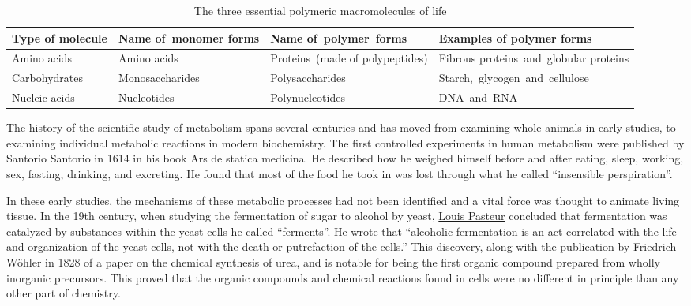 \begin{table}

\caption{\label{tab:macromol}The three essential polymeric macromolecules of life}
\centering
\begin{tabular}[t]{>{\raggedright\arraybackslash}p{10em}>{\raggedright\arraybackslash}p{10em}>{\raggedright\arraybackslash}p{15em}>{\raggedright\arraybackslash}p{15em}}
\toprule
Type of molecule & Name of monomer forms & Name of polymer forms & Examples of polymer forms\\
\midrule
\rowcolor{gray!6}  Amino acids & Amino acids & Proteins (made of polypeptides) & Fibrous proteins and globular proteins\\
Carbohydrates & Monosaccharides & Polysaccharides & Starch, glycogen and cellulose\\
\rowcolor{gray!6}  Nucleic acids & Nucleotides & Polynucleotides & DNA and RNA\\
\bottomrule
\end{tabular}
\end{table}

\twocolumn

The history of the scientific study of metabolism spans several centuries and has moved from examining whole animals in early studies, to examining individual metabolic reactions in modern biochemistry. The first controlled experiments in human metabolism were published by Santorio Santorio in 1614 in his book Ars de statica medicina. He described how he weighed himself before and after eating, sleep, working, sex, fasting, drinking, and excreting. He found that most of the food he took in was lost through what he called ``insensible perspiration''.

In these early studies, the mechanisms of these metabolic processes had not been identified and a vital force was thought to animate living tissue. In the 19th century, when studying the fermentation of sugar to alcohol by yeast, \href{https://en.wikipedia.org/wiki/Louis_Pasteur}{Louis Pasteur} concluded that fermentation was catalyzed by substances within the yeast cells he called ``ferments''. He wrote that ``alcoholic fermentation is an act correlated with the life and organization of the yeast cells, not with the death or putrefaction of the cells.'' This discovery, along with the publication by Friedrich Wöhler in 1828 of a paper on the chemical synthesis of urea, and is notable for being the first organic compound prepared from wholly inorganic precursors. This proved that the organic compounds and chemical reactions found in cells were no different in principle than any other part of chemistry.

